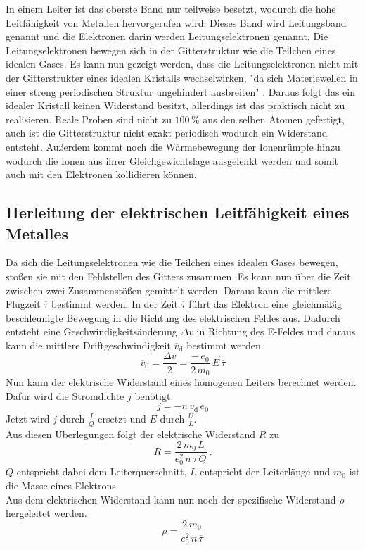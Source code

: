 In einem Leiter ist das oberste Band nur teilweise besetzt, wodurch die hohe Leitfähigkeit von Metallen hervorgerufen wird. Dieses Band wird Leitungsband genannt und die Elektronen darin werden Leitungselektronen genannt. Die Leitungselektronen bewegen sich in der Gitterstruktur wie die Teilchen eines idealen Gases. Es kann nun gezeigt werden, dass die Leitungselektronen nicht mit der Gitterstrukter eines idealen Kristalls wechselwirken, "da sich Materiewellen in einer streng periodischen Struktur ungehindert ausbreiten" \cite[2]{sample}. Daraus folgt das ein idealer Kristall keinen Widerstand besitzt, allerdings ist das praktisch nicht zu realisieren. Reale Proben sind nicht zu $100\,\%$ aus den selben Atomen gefertigt, auch ist die Gitterstruktur nicht exakt periodisch wodurch ein Widerstand entsteht. Außerdem kommt noch die Wärmebewegung der Ionenrümpfe hinzu wodurch die Ionen aus ihrer Gleichgewichtslage ausgelenkt werden und somit auch mit den Elektronen kollidieren können.


\subsection{Herleitung der elektrischen Leitfähigkeit eines Metalles}
Da sich die Leitungselektronen wie die Teilchen eines idealen Gases bewegen, stoßen sie mit den Fehlstellen des Gitters zusammen. Es kann nun über die Zeit zwischen zwei Zusammenstößen gemittelt werden. Daraus kann die mittlere Flugzeit $\overline{\tau}$ bestimmt werden. In der Zeit $\overline{\tau}$ führt das Elektron eine gleichmäßig beschleunigte Bewegung in die Richtung des elektrischen Feldes aus. Dadurch entsteht eine Geschwindigkeitsänderung $\Delta\overline{v}$ in Richtung des E-Feldes und daraus kann die mittlere Driftgeschwindigkeit $\overline{v}_\text{d}$ bestimmt werden.
\begin{equation}
	\overline{v}_\text{d} = \frac{\Delta\overline{v}}{2} = \frac{-\,e_0}{2\,m_0}\,\vec{E}\,\overline{\tau}
	\label{eqn:drift}
\end{equation}
Nun kann der elektrische Widerstand eines homogenen Leiters berechnet werden. Dafür wird die Stromdichte $j$ benötigt.
\begin{equation}
	j = -n\,\overline{v}_\text{d}\,e_0
	\label{eqn:j}
\end{equation}
Jetzt wird $j$ durch $\frac{I}{Q}$ ersetzt und $E$ durch $\frac{U}{L}$. \\
Aus diesen Überlegungen folgt der elektrische Widerstand $R$ zu
\begin{equation}
	R = \frac{2\,m_0\,L}{e_0^2\,n\,\overline{\tau}\,Q} \ .
	\label{eqn:R}
\end{equation}
$Q$ entspricht dabei dem Leiterquerschnitt, $L$ entspricht der Leiterlänge und $m_0$ ist die Masse eines Elektrons. \\
Aus dem elektrischen Widerstand kann nun noch der spezifische Widerstand $\rho$ hergeleitet werden.
\begin{equation}
	\rho = \frac{2\,m_0}{e_0^2\,n\,\overline{\tau}}
	\label{eqn:rho}
\end{equation}


